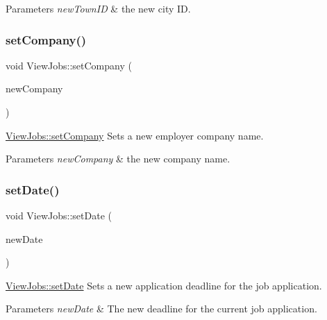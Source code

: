 \begin{DoxyParams}{Parameters}
{\em new\+Town\+ID} & the new city ID. \\
\hline
\end{DoxyParams}
\mbox{\label{class_view_jobs_a596246d07be66a5aeaf14ff8e5649290}} 
\subsubsection{\texorpdfstring{set\+Company()}{setCompany()}}
{\footnotesize\ttfamily void View\+Jobs\+::set\+Company (\begin{DoxyParamCaption}\item[{Q\+String}]{new\+Company }\end{DoxyParamCaption})}



\hyperlink{class_view_jobs_a596246d07be66a5aeaf14ff8e5649290}{View\+Jobs\+::set\+Company} Sets a new employer company name. 


\begin{DoxyParams}{Parameters}
{\em new\+Company} & the new company name. \\
\hline
\end{DoxyParams}
\mbox{\label{class_view_jobs_a7574794410eb40956f343976de97221f}} 
\subsubsection{\texorpdfstring{set\+Date()}{setDate()}}
{\footnotesize\ttfamily void View\+Jobs\+::set\+Date (\begin{DoxyParamCaption}\item[{Q\+String}]{new\+Date }\end{DoxyParamCaption})}



\hyperlink{class_view_jobs_a7574794410eb40956f343976de97221f}{View\+Jobs\+::set\+Date} Sets a new application deadline for the job application. 


\begin{DoxyParams}{Parameters}
{\em new\+Date} & The new deadline for the current job application. \\
\hline
\end{DoxyParams}
\mbox{\label{class_view_jobs_a53bdfabaf2b442841d676f42ebbf975f}} 
